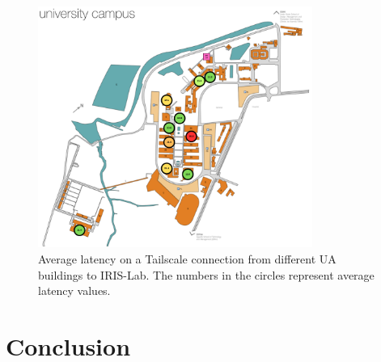 \documentclass[11pt,twoside,a4paper]{report}
\begin{document}
\begin{figure}[h]
\centering
\includegraphics[width=0.8\textwidth]{ua-latency.png}
\caption{Average latency on a Tailscale connection from different UA buildings to IRIS-Lab. The numbers in the circles represent average latency values.}
\label{fig:ualats}
\end{figure}

\chapter{Conclusion}


%
%
\cleardoublepage
\iffalse
\else






\cleardoublepage
\end{document}
